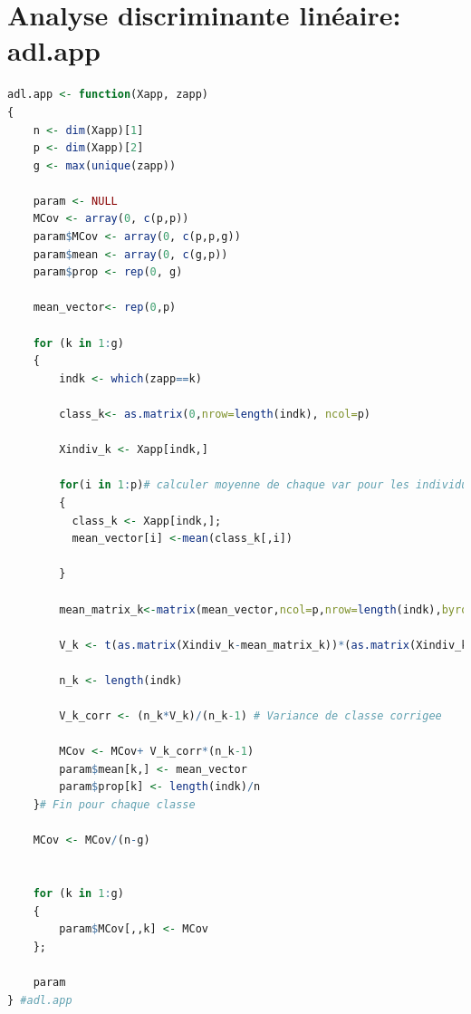 \documentclass{article}
\begin{document}
\section{Analyse discriminante linéaire: adl.app}
\label{adl.val}
\begin{lstlisting}[language=R]
adl.app <- function(Xapp, zapp)
{
	n <- dim(Xapp)[1]
	p <- dim(Xapp)[2]
	g <- max(unique(zapp))

	param <- NULL
	MCov <- array(0, c(p,p))
	param$MCov <- array(0, c(p,p,g))
	param$mean <- array(0, c(g,p))
	param$prop <- rep(0, g)

	mean_vector<- rep(0,p)
	
	for (k in 1:g)
	{
		indk <- which(zapp==k)

		class_k<- as.matrix(0,nrow=length(indk), ncol=p)
		
		Xindiv_k <- Xapp[indk,]
		
		for(i in 1:p)# calculer moyenne de chaque var pour les individus de la classe k
		{
		  class_k <- Xapp[indk,];
		  mean_vector[i] <-mean(class_k[,i])
		  
		}
		
		mean_matrix_k<-matrix(mean_vector,ncol=p,nrow=length(indk),byrow=TRUE) # matrice p*nombre d'individu de la classe k
		
		V_k <- t(as.matrix(Xindiv_k-mean_matrix_k))*(as.matrix(Xindiv_k-mean_matrix_k))/length(indk)

		n_k <- length(indk)

		V_k_corr <- (n_k*V_k)/(n_k-1) # Variance de classe corrigee
		
		MCov <- MCov+ V_k_corr*(n_k-1)
		param$mean[k,] <- mean_vector
		param$prop[k] <- length(indk)/n
	}# Fin pour chaque classe
	
	MCov <- MCov/(n-g)
	
	  
	for (k in 1:g)
	{
		param$MCov[,,k] <- MCov
	};

	param
} #adl.app
\end{lstlisting}
\end{document}
